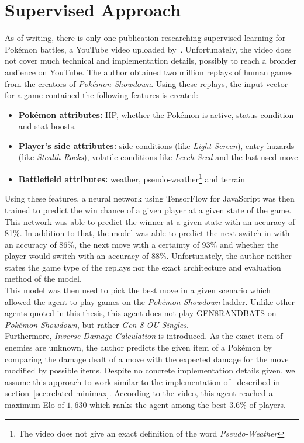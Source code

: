 \section{Supervised Approach}
As of writing, there is only one publication researching supervised learning for Pokémon battles,
a YouTube video uploaded by~\cite{TheThirdBuild:PokemonAI}.
Unfortunately, the video does not cover much technical and implementation details, possibly to reach a 
broader audience on YouTube.
The author obtained two million 
replays of human games from the creators of \textit{Pokémon Showdown}. Using these replays, the input vector for a game
contained the following features is created:
\begin{itemize}
    \item \textbf{Pokémon attributes:} \ac{HP}, whether the Pokémon is active, status condition and stat boosts.
    \item \textbf{Player's side attributes:} side conditions (like \textit{Light Screen}), entry hazards 
    (like \textit{Stealth Rocks}), volatile conditions like \textit{Leech Seed} and the last used move
    \item \textbf{Battlefield attributes:} weather, pseudo-weather\footnote{The video does not give an exact 
    definition of the word \textit{Pseudo-Weather}} and terrain
\end{itemize}
Using these features, a neural network using TensorFlow for JavaScript was then trained to predict the 
win chance of a given player at a given state of the game. This network was able to predict the winner
at a given state with an accuracy of 81\%. In addition to that, the model was able to predict the next
switch in with an accuracy of 86\%, the next move with a certainty of 93\% and whether the
player would switch with an accuracy of 88\%. Unfortunately, the author neither states the game type of
the replays nor the exact architecture and evaluation method of the model. \\
This model was then used to pick the best move in a given scenario which allowed the agent to play games
on the \textit{Pokémon Showdown} ladder. Unlike other agents quoted in this thesis, this agent does not play
\ac{GEN8RANDBATS} on \textit{Pokémon Showdown}, but rather \emph{Gen 8 OU Singles}. \\
Furthermore, \textit{Inverse Damage Calculation} is introduced. As the exact item of 
enemies are unknown, the author predicts the given item of a Pokémon by comparing the damage dealt
of a move with the expected damage for the move modified by possible items. Despite no concrete 
implementation details given, we assume this approach to work similar to the implementation 
of~\cite{Github:pmariglia-showdown} described in section~\ref{sec:related-minimax}.
According to the video, this agent reached a maximum Elo of $1,630$ which ranks the agent among the 
best $3.6\%$ of players.